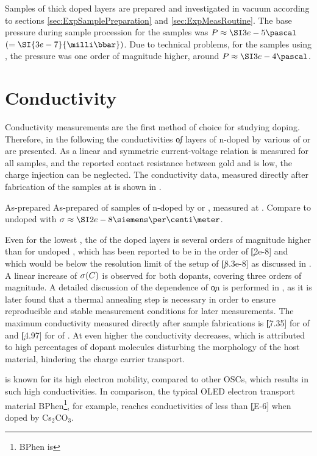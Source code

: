 Samples of  thick doped layers are prepared and investigated in vacuum according to sections \ref{sec:ExpSamplePreparation} and \ref{sec:ExpMeasRoutine}. The base pressure during sample procession for the \CrPd samples was \mbox{$\druck\approx\pa{3e-5}$} $(=\SI{3e-7}{\milli\bbar})$. Due to technical problems, for the samples using \WPd, the pressure was one order of magnitude higher, around \mbox{$\druck\approx\pa{3e-4}$}.

\section{Conductivity}\label{sec:ResPdCond}
Conductivity measurements are the first method of choice for studying doping. Therefore, in the following the conductivities \c of layers of \CS n-doped by various \CLongs \C of \CrPd or \WPd are presented. As a linear and symmetric current-voltage relation is measured for all samples, and the reported contact resistance between gold and \CS is low\cite{Kitamura2011}, the charge injection can be neglected. The conductivity data, measured directly after fabrication of the samples at \T[25] is shown in .

{As-prepared \cLong \vs \CLong}
{As-prepared \cLongL \vs \CLongL of samples of \CS n-doped by \CrPd or \WPd, measured at \T[25]. Compare to undoped \CS with \mbox{$\c\approx \Scm{2e-8}$}\cite{Li2006}.}

Even for the lowest \CLong, the \cLong of the doped layers is several orders of magnitude higher than for undoped \CS, which has been reported to be in the order of \c[2e-8]\cite{Li2006} and which would be below the resolution limit of the setup of \c[8.3e-8] as discussed in .
A linear increase of $\c(\C)$ is observed for both dopants, covering three orders of magnitude. A detailed discussion of the dependence of \c on \C is performed in , as it is later found that a thermal annealing step is necessary in order to ensure reproducible and stable measurement conditions for later measurements. The maximum conductivity measured directly after sample fabrications is \c[7.35] for \C[0.210] of \CrPd and \c[4.97] for \C[0.150] of \WPd.
At even higher \CLongs the conductivity decreases, which is attributed to high percentages of dopant molecules disturbing the morphology of the host material, hindering the charge carrier transport.

\CS is known for its high electron mobility, compared to other OSCs, which results in such high conductivities. In comparison, the typical OLED electron transport material BPhen\footnote{BPhen is \bphenLong}, for example, reaches conductivities of less than \c[E-6] when doped by Cs$_2$CO$_3$\cite{Park2008}.

